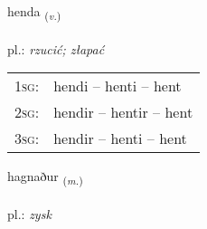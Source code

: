 \documentclass[frontgrid, backgrid]{flacards}\usepackage[]{graphicx}\usepackage[]{xcolor}
\begin{document}
\renewcommand{\flhead}{\vskip5pt \fboxsep=0pt {\small\bfseries\footnotesize Sagnorð | Verb}}
\renewcommand{\fcfoot}{\vskip5pt \fboxsep=0pt \hspace{2pt}{\small\bfseries\footnotesize 2K}}

\renewcommand{\blhead}{\vskip5pt {\small\bfseries\footnotesize Sagnorð | Verb }}
\renewcommand{\bcfoot}{\vskip5pt \hspace{2pt}{\small\bfseries\footnotesize 2K}}


{henda \small{\textsubscript{(\textit{v.})}} \\[1ex] %
\textphonetic{[hɛnta]} \\
pl.: \emph{rzucić; złapać} \\  [2ex]
\renewcommand*{\arraystretch}{0.8}
\begin{tabular}{p{1cm}l}
\textsc{1sg}: & hendi -- henti -- hent \\ 
\textsc{2sg}: & hendir -- hentir -- hent \\ 
\textsc{3sg}: & hendir -- henti -- hent \\ 
\end{tabular}
}

\renewcommand{\flhead}{\vskip5pt \fboxsep=0pt {\small\bfseries\footnotesize Nafnorð | Noun}}
\renewcommand{\fcfoot}{\vskip5pt \fboxsep=0pt \hspace{2pt}{\small\bfseries\footnotesize 2K}}

\renewcommand{\blhead}{\vskip5pt {\small\bfseries\footnotesize Nafnorð | Noun }}
\renewcommand{\bcfoot}{\vskip5pt \hspace{2pt}{\small\bfseries\footnotesize 2K}}


{hagnaður \small{\textsubscript{(\textit{m.})}} \\[1ex] %
\textphonetic{[haknaðʏr]} \\
pl.: \emph{zysk} \\  [2ex]
\renewcommand*{\arraystretch}{0.8}
}
\end{document}
